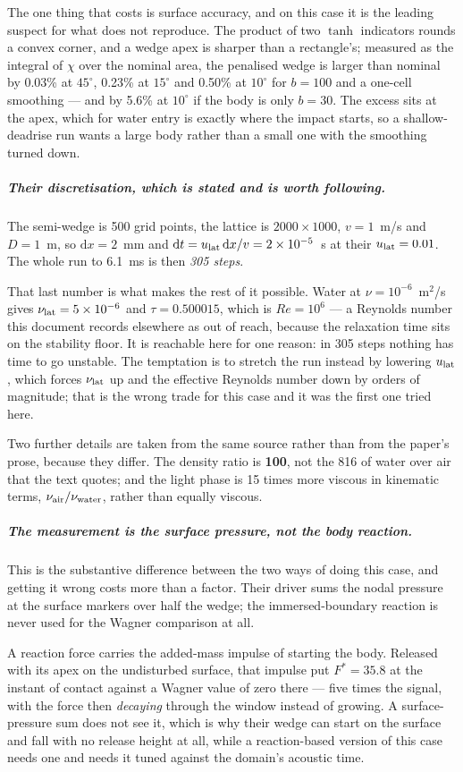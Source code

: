 \documentclass[11pt,a4paper]{article}
\newcommand{\e}[1]{\times 10^{#1}}
\begin{document}
The one thing that costs is surface accuracy, and on this case it is the
leading suspect for what does not reproduce. The product of two $\tanh$ indicators rounds a convex corner, and
a wedge apex is sharper than a rectangle's; measured as the integral of $\chi$
over the nominal area, the penalised wedge is larger than nominal by 0.03\% at
$45^\circ$, 0.23\% at $15^\circ$ and 0.50\% at $10^\circ$ for $b=100$ and a
one-cell smoothing --- and by 5.6\% at $10^\circ$ if the body is only $b=30$.
The excess sits at the apex, which for water entry is exactly where the impact
starts, so a shallow-deadrise run wants a large body rather than a small one
with the smoothing turned down.

\subparagraph{Their discretisation, which is stated and is worth following.}
The semi-wedge is 500 grid points, the lattice is $2000\times1000$, $v=1$~m/s
and $D=1$~m, so $\mathrm{d}x = 2$~mm and $\mathrm{d}t = u_{\rm lat}\,
\mathrm{d}x/v = 2\e{-5}$~s at their $u_{\rm lat}=0.01$. The whole run to
6.1~ms is then \emph{305 steps}.

That last number is what makes the rest of it possible. Water at
$\nu=10^{-6}$~m$^2$/s gives $\nu_{\rm lat}=5\e{-6}$ and $\tau=0.500015$, which
is $Re=10^6$ --- a Reynolds number this document records elsewhere as out of
reach, because the relaxation time sits on the stability floor. It is reachable
here for one reason: in 305 steps nothing has time to go unstable. The
temptation is to stretch the run instead by lowering $u_{\rm lat}$, which
forces $\nu_{\rm lat}$ up and the effective Reynolds number down by orders of
magnitude; that is the wrong trade for this case and it was the first one tried
here.

Two further details are taken from the same source rather than from the paper's
prose, because they differ. The density ratio is \textbf{100}, not the 816 of
water over air that the text quotes; and the light phase is 15 times more
viscous in kinematic terms, $\nu_{\rm air}/\nu_{\rm water}$, rather than
equally viscous.

\subparagraph{The measurement is the surface pressure, not the body reaction.}
This is the substantive difference between the two ways of doing this case, and
getting it wrong costs more than a factor. Their driver sums the nodal pressure
at the surface markers over half the wedge; the immersed-boundary reaction is
never used for the Wagner comparison at all.

A reaction force carries the added-mass impulse of starting the body. Released
with its apex on the undisturbed surface, that impulse put $F^*=35.8$ at the
instant of contact against a Wagner value of zero there --- five times the
signal, with the force then \emph{decaying} through the window instead of
growing. A surface-pressure sum does not see it, which is why their wedge can
start on the surface and fall with no release height at all, while a
reaction-based version of this case needs one and needs it tuned against the
domain's acoustic time.
\end{document}
